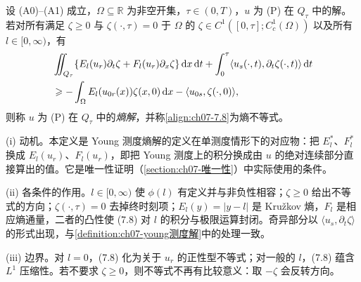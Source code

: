 ﻿\documentclass[../../main.tex]{subfiles}%
\begin{document}
\begin{definition}\label{definition:ch07-Qtau熵解}
设 (A0)--(A1) 成立，$\Omega\subseteq\mathbb{R}$ 为非空开集，$\tau\in(0,T)$，$u$ 为 (P) 在 $Q_\tau$ 中的解。若对所有满足 $\zeta\geqslant0$ 与 $\zeta(\cdot,\tau)=0$ 于 $\Omega$ 的 $\zeta\in C^1([0,\tau];C_c^1(\Omega))$ 以及所有 $l\in[0,\infty)$，有
\begin{align}
&\iint_{Q_\tau}\{E_l(u_r)\partial_t\zeta+F_l(u_r)\partial_x\zeta\}\,\mathrm{d}x\,\mathrm{d}t
+\int_0^\tau\langle u_s(\cdot,t),\partial_t\zeta(\cdot,t)\rangle\,\mathrm{d}t\notag\\
&\geqslant-\int_\Omega E_l(u_{0r}(x))\zeta(x,0)\,\mathrm{d}x
-\langle u_{0s},\zeta(\cdot,0)\rangle, \label{align:ch07-7.8}
\end{align}
则称 $u$ 为 (P) 在 $Q_\tau$ 中的\emph{熵解}，并称\eqref{align:ch07-7.8}为熵不等式。
\end{definition}

\begin{remark}\label{remark:ch07-Qtau熵解动机}
(i) 动机。本定义是 Young 测度熵解的定义在单测度情形下的对应物：把 $E_l^*$、$F_l^*$ 换成 $E_l(u_r)$、$F_l(u_r)$，即把 Young 测度上的积分换成由 $u$ 的绝对连续部分直接算出的值。它是唯一性证明（\cref{section:ch07-唯一性}）中实际使用的条件。

(ii) 各条件的作用。$l\in[0,\infty)$ 使 $\phi(l)$ 有定义并与非负性相容；$\zeta\geqslant0$ 给出不等式的方向；$\zeta(\cdot,\tau)=0$ 去掉终时刻项；$E_l(y)=|y-l|$ 是 Kružkov 熵，$F_l$ 是相应熵通量，二者的凸性使 (7.8) 对 $l$ 的积分与极限运算封闭。奇异部分以 $\langle u_s,\partial_t\zeta\rangle$ 的形式出现，与\cref{definition:ch07-young测度解}中的处理一致。

(iii) 边界。对 $l=0$，(7.8) 化为关于 $u_r$ 的正性型不等式；对一般的 $l$，(7.8) 蕴含 $L^1$ 压缩性。若不要求 $\zeta\geqslant0$，则不等式不再有比较意义：取 $-\zeta$ 会反转方向。
\end{remark}
\end{document}
